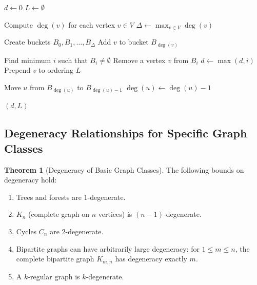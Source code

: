 \documentclass{article}
\theoremstyle{definition}
\newtheorem{theorem}{Theorem}
\begin{document}
\pagebreak
\newpage
\clearpage

\begin{algorithm}
\caption{Efficient Implementation of Matula-Beck Algorithm}
\label{alg:efficient-matula-beck}
\begin{algorithmic}[1]
        \State $d \gets 0$ 
        \State $L \gets \emptyset$ 
        
        \State Compute $\deg(v)$ for each vertex $v \in V$
        \State $\Delta \gets \max_{v \in V} \deg(v)$ 
        
        \State Create buckets $B_0, B_1, \ldots, B_{\Delta}$
            \State Add $v$ to bucket $B_{\deg(v)}$
        \EndFor
        
            \State Find minimum $i$ such that $B_i \neq \emptyset$
            \State Remove a vertex $v$ from $B_i$
            \State $d \gets \max(d, i)$ 
            \State Prepend $v$ to ordering $L$
            
                \State Move $u$ from $B_{\deg(u)}$ to $B_{\deg(u)-1}$
                \State $\deg(u) \gets \deg(u) - 1$ 
            \EndFor
        \EndWhile
        
        \State \Return $(d, L)$ 
    \EndProcedure
\end{algorithmic}
\end{algorithm}

\subsection{Degeneracy Relationships for Specific Graph Classes}

\begin{theorem}[Degeneracy of Basic Graph Classes]
The following bounds on degeneracy hold:
\begin{enumerate}
    \item Trees and forests are 1-degenerate.
    \item $K_n$ (complete graph on $n$ vertices) is $(n-1)$-degenerate.
    \item Cycles $C_n$ are 2-degenerate.
    \item Bipartite graphs can have arbitrarily large degeneracy: for $1 \leq m \leq n$, the complete bipartite graph $K_{m,n}$ has degeneracy exactly $m$.
    \item A $k$-regular graph is $k$-degenerate.
\end{enumerate}
\end{theorem}
\end{document}
